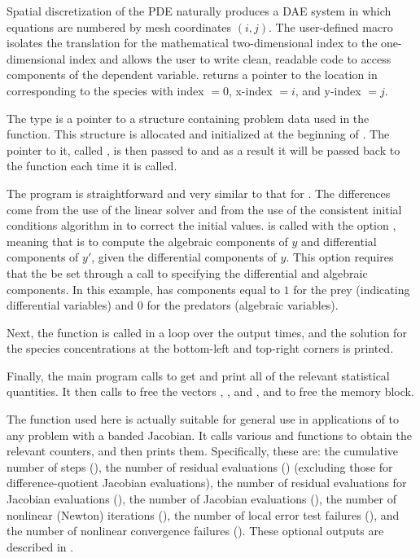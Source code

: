Spatial discretization of the PDE naturally produces a DAE system in
which equations are numbered by mesh coordinates $(i,j)$. The
user-defined macro  isolates the translation for the
mathematical two-dimensional index to the one-dimensional
 index and allows the user to write clean, readable code
to access components of the dependent variable. 
 returns a pointer to the location in  corresponding to 
the species with index  $= 0$, x-index  $= i$, and y-index  $= j$.

The type  is a pointer to a structure containing problem
data used in the  function.  This structure is
allocated and initialized at the beginning of . The pointer
to it, called , is then passed to  and as a result 
it will be passed back to the  function each time it is called.

The  program is straightforward and very similar to that for .
The differences come from the use of the {\idaband} linear solver and from the
use of the consistent initial conditions algorithm in {\ida} to correct the initial
values.  is called with the option , meaning
that {\ida} is to compute the algebraic components of $y$ and differential  
components of $y'$, given the differential components of $y$.  
This option requires that the   be set through a call to 
 specifying the differential and algebraic components. In this example,
 has components equal to $1$ for the prey (indicating differential 
variables) and $0$ for the predators (algebraic variables).

Next, the  function is called in a loop over the output times,
and the solution for the species concentrations at the bottom-left and
top-right corners is printed.

Finally, the main program calls  to get and print
all of the relevant statistical quantities.  It then calls 
to free the vectors , , and , and  to free the 
{\ida} memory block.

The function  used here is actually suitable for
general use in applications of {\ida} to any problem with a banded
Jacobian.  It calls various  and 
functions to obtain the relevant counters, and then prints them.
Specifically, these are: the cumulative number of steps (), 
the number of residual evaluations () (excluding those for
difference-quotient Jacobian evaluations),
the number of residual evaluations for Jacobian evaluations (),
the number of Jacobian evaluations (),
the number of nonlinear (Newton) iterations (),
the number of local error test failures (),
and the number of nonlinear convergence failures ().
These optional outputs are described in .

